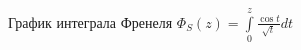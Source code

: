 \documentclass[12pt, a4paper]{article}
\begin{document}
\begin{figure}[H]
\centering
\begin{minipage}[t]{.4\textwidth}
\begin{figure}[H]
  \centering
  \caption{График интеграла Френеля $\Phi_{S}(z) = \int\limits_0^{z} \frac{\cos{t}}{\sqrt{t}} dt$}
  \label{fig:fren2_int}
  \end{figure}%
\end{minipage}\hspace{10pt}%
\begin{minipage}[t]{.4\textwidth}%
\begin{figure}[H]
  \centering

\end{figure}
\end{minipage}
\end{figure}
\end{document}
